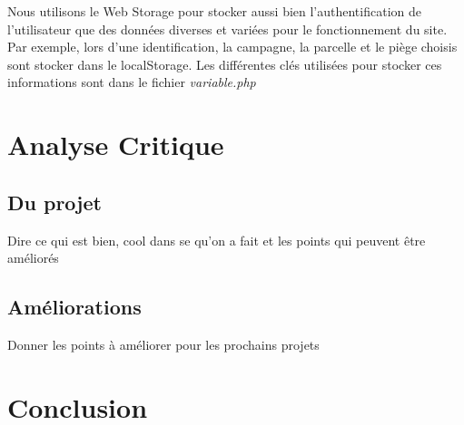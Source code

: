 \documentclass[twoside]{EPURapport}
\begin{document}
		Nous utilisons le Web Storage pour stocker aussi bien l'authentification de l'utilisateur que des données diverses et variées pour le fonctionnement du site. Par exemple, lors d'une identification, la campagne, la parcelle et le piège choisis sont stocker dans le localStorage. Les différentes clés utilisées pour stocker ces informations sont dans le fichier \emph{variable.php}

\chapter{Analyse Critique}

	\section{Du projet}
	
	Dire ce qui est bien, cool dans se qu'on a fait et les points qui peuvent être améliorés
	
	\section{Améliorations}
	
	Donner les points à améliorer pour les prochains projets

\chapter{Conclusion}

\annexes
\end{document}
